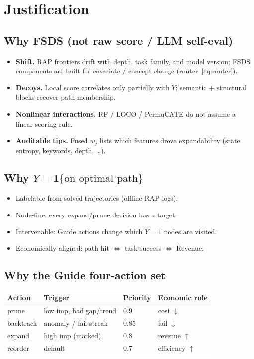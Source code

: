 \documentclass[11pt]{article}
\newcommand{\imp}{\mathrm{imp}}
\newcommand{\ind}{\mathbf{1}}
\begin{document}
\section{Justification}
\label{sec:justify}

\subsection{Why FSDS (not raw score / LLM self-eval)}
\begin{itemize}[leftmargin=1.2em]
  \item \textbf{Shift.} RAP frontiers drift with depth, task family, and
        model version; FSDS components are built for covariate / concept
        change (router~\eqref{eq:router}).
  \item \textbf{Decoys.} Local score correlates only partially with
        $Y$; semantic + structural blocks recover path membership.
  \item \textbf{Nonlinear interactions.} RF / LOCO / PermuCATE do not
        assume a linear scoring rule.
  \item \textbf{Auditable tips.} Fused $w_j$ lists which features drove
        expandability (state entropy, keywords, depth, \ldots).
\end{itemize}

\subsection{Why $Y=\ind\{\text{on optimal path}\}$}
\begin{itemize}[leftmargin=1.2em]
  \item Labelable from solved trajectories (offline RAP logs).
  \item Node-fine: every expand/prune decision has a target.
  \item Intervenable: Guide actions change which $Y{=}1$ nodes are visited.
  \item Economically aligned: path hit $\Leftrightarrow$ task success $\Leftrightarrow$ Revenue.
\end{itemize}

\subsection{Why the Guide four-action set}
\begin{center}
\begin{tabular}{@{}llll@{}}
\toprule
Action & Trigger & Priority & Economic role \\
\midrule
prune & low $\imp$, bad gap/trend & 0.9 & cost $\downarrow$ \\
backtrack & anomaly / fail streak & 0.85 & fail $\downarrow$ \\
expand & high $\imp$ (marked) & 0.8 & revenue $\uparrow$ \\
reorder & default & 0.7 & efficiency $\uparrow$ \\
\bottomrule
\end{tabular}
\end{center}
\end{document}
